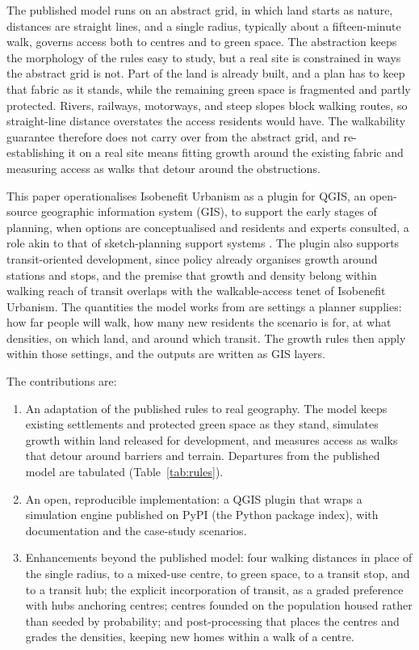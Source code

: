 \documentclass[11pt]{article}
\begin{document}
The published model runs on an abstract grid, in which land
starts as nature, distances are straight lines, and a single radius,
typically about a fifteen-minute walk, governs access both to
centres and to green space. The abstraction keeps the morphology of
the rules easy to study, but a real site is constrained in ways the
abstract grid is not. Part of the land is already built, and a plan
has to keep that fabric as it stands, while the remaining
green space is fragmented and partly protected. Rivers, railways,
motorways, and steep slopes block walking routes, so straight-line
distance overstates the access residents would have. The walkability
guarantee therefore does not carry over from the abstract grid, and
re-establishing it on a real site means fitting growth around the
existing fabric and measuring access as walks that detour around
the obstructions.

This paper operationalises Isobenefit Urbanism as a plugin for QGIS,
an open-source geographic information system (GIS), to support
the early stages of planning, when options are conceptualised and
residents and experts consulted, a role akin to that of
sketch-planning support systems \citep[cf.][]{klosterman1999,
geertman_stillwell2004, waddell2002}. The
plugin also supports transit-oriented development, since policy
already organises growth around stations and stops, and the premise
that growth and density belong within walking reach of transit
\citep{calthorpe1993, cervero_kockelman1997, ibraeva2020} overlaps
with the walkable-access tenet of Isobenefit Urbanism. The
quantities the model works from are settings a
planner supplies: how far people will walk, how many new residents
the scenario is for, at what densities, on which land, and around
which transit. The growth rules then apply within those settings,
and the outputs are written as GIS layers.

The contributions are:

\begin{enumerate}
  \item An adaptation of the published rules to real geography. The
    model keeps existing settlements and protected green space as they
    stand, simulates growth within land released for development, and
    measures access as walks that detour around barriers and terrain.
    Departures from the published model are tabulated
    (Table~\ref{tab:rules}).
  \item An open, reproducible implementation: a QGIS plugin that wraps a
    simulation engine published on PyPI (the Python package index),
    with documentation and the case-study scenarios.
  \item Enhancements beyond the published model: four walking distances in place of the single radius, to a mixed-use centre, to green space, to a transit stop, and to a transit hub; the explicit incorporation of transit, as a graded preference with hubs anchoring centres; centres founded on the population housed rather than seeded by probability; and post-processing that places the centres and grades the densities, keeping new homes within a walk of a centre.
\end{enumerate}
\end{document}
